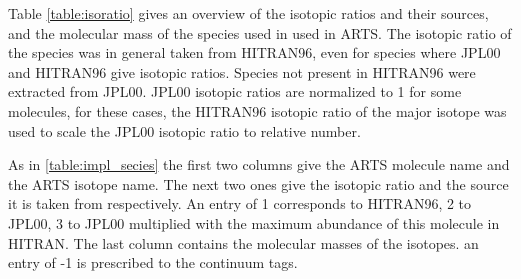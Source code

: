 Table \ref{table:isoratio} gives an overview of the isotopic ratios
and their sources, and the molecular mass of the species used in used
in ARTS.  The isotopic ratio of the species was in general taken from
HITRAN96, even for species where JPL00 and HITRAN96 give isotopic
ratios. Species not present in HITRAN96 were extracted from JPL00.
JPL00 isotopic ratios are normalized to 1 for some molecules, for
these cases, the HITRAN96 isotopic ratio of the major isotope was used
to scale the JPL00 isotopic ratio to relative number.

As in \ref{table:impl_secies} the first two columns give the ARTS
molecule name and  the ARTS isotope name. The next two ones give the
isotopic ratio and the source it is taken from respectively. An entry
of 1 corresponds to HITRAN96, 2 to JPL00, 3 to JPL00 multiplied with
the maximum abundance of this molecule in HITRAN. The last column
contains the molecular masses of the isotopes. an entry of -1 is
prescribed to the continuum tags.



